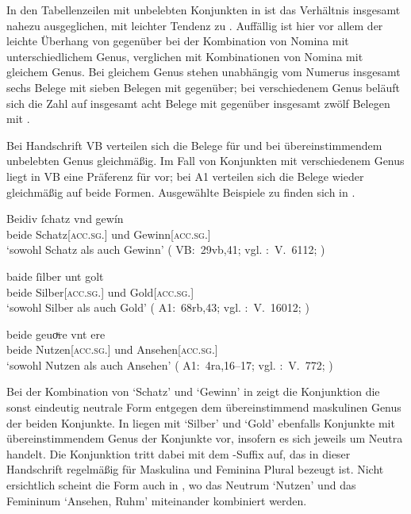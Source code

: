 In den Tabellenzeilen mit unbelebten Konjunkten in  ist
das Verhältnis insgesamt nahezu ausgeglichen, mit leichter Tendenz zu
. Auffällig ist hier vor allem der leichte Überhang von
 gegenüber  bei der Kombination von Nomina mit
unterschiedlichem Genus,
verglichen mit Kombinationen von Nomina
mit gleichem Genus. Bei gleichem Genus stehen unabhängig vom Numerus insgesamt
sechs Belege mit  sieben Belegen mit  gegenüber; bei
verschiedenem Genus beläuft sich die Zahl auf insgesamt acht Belege mit
 gegenüber insgesamt zwölf Belegen mit .

Bei Handschrift VB verteilen sich die Belege für  und
 bei übereinstimmendem unbelebten Genus gleichmäßig. Im Fall von
Konjunkten mit verschiedenem Genus liegt in VB eine Präferenz für
 vor; bei A1 verteilen sich die Belege wieder
gleichmäßig auf beide Formen. Ausgewählte Beispiele zu 
finden sich in .

\begin{exe}
\ex \label{ex:konjbeidirreginan}
	\begin{xlist}
	\ex \gll Beidiv ſchatz vnd gewín \\
			beide Schatz[\textsc{acc.sg.\MascI}] und Gewinn[\textsc{acc.sg.\MascI}] \\
		\trans `sowohl Schatz als auch Gewinn'
			(%
				VB:~29vb,41; vgl.
				\KC:~V.~6112;
				\cite[194]{schroeder1895}%
			)
		\label{ex:konjbeidirreginan_1}

	\ex \gll baide ſilber unt golt \\
			beide Silber[\textsc{acc.sg.\NeutI}] und Gold[\textsc{acc.sg.\NeutI}] \\
		\trans `sowohl Silber als auch Gold'
			(%
				A1:~68rb,43; vgl.
				\KC:~V.~16012;
				\cite[370]{schroeder1895}%
			)
		\label{ex:konjbeidirreginan_2}

	\ex \gll beide geuoͮre vnt ere \\
			beide Nutzen[\textsc{acc.sg.\NeutI}] und Ansehen[\textsc{acc.sg.\FemI}] \\
		\trans `sowohl Nutzen als auch Ansehen'
			(%
				A1:~4ra,16--17; vgl.
				\KC:~V.~772;
				\cite[95]{schroeder1895}%
			)
		\label{ex:konjbeidirreginan_3}
	\end{xlist}
\end{exe}

Bei der Kombination von  `Schatz' und 
`Gewinn' in  zeigt die Konjunktion die sonst
eindeutig neutrale Form entgegen dem übereinstimmend maskulinen Genus der
beiden Konjunkte. In  liegen mit 
`Silber' und  `Gold' ebenfalls Konjunkte mit
übereinstimmendem Genus der Konjunkte vor, insofern es sich jeweils um Neutra
handelt. Die Konjunktion tritt dabei mit dem -Suffix auf, das in dieser
Handschrift regelmäßig für Maskulina und Feminina Plural bezeugt ist. Nicht
ersichtlich scheint die Form  auch in ,
wo das Neutrum  `Nutzen' und das Femininum 
`Ansehen, Ruhm' miteinander kombiniert werden.

